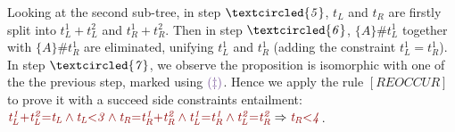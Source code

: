 \documentclass[acmsmall,10pt,review]{acmart}
\newcommand{\code}[1]{{\tt{\ensuremath{\m{#1}}}}}
\newcommand{\m}{\mathit}
\begin{document}
Looking at the second sub-tree, in step \code{\textcircled{5}}, \code{t_L} and \code{t_R} are firstly split 
into \code{t_L^1{+}t_L^2} and \code{t_R^1{+}t_R^2}. 
Then in step \code{\textcircled{6}}, 
\code{\{A\} \# t_L^1} together with \code{\{A\} \# t_R^1} are eliminated, unifying \code{t_L^1} and \code{t_R^1} (adding the constraint \code{ t_L^1 {=}  t_R^1}).
In step \code{\textcircled{7}}, we observe the proposition is isomorphic with one of the the previous step, marked using \code{\textcolor{darklavender}{(\ddagger)}}. 
Hence we apply the rule \code{[REOCCUR]} to prove it with a succeed side constraints entailment: \code{\textcolor {
      darkred}{t_L^1{+}t_L^2{=}t_L \wedge t_L{<}3 \wedge t_R{=}t_R^1{+}t_R^2 \wedge t_L^1{=}t_R^1
      \wedge t_L^2{=}t_R^2
    }\Rightarrow
    \textcolor {darkred}{t_R{<}4} }. 
\end{document}
